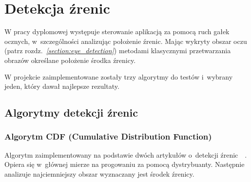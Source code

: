 \newpage

\section{Detekcja źrenic}

W pracy dyplomowej występuje sterowanie aplikacją za pomocą ruch gałek ocznych, w~szczególności analizując położenie źrenic. Mając wykryty obszar oczu (patrz rozdz.~\hyperref[{section:eye_detection}]{\textit{\ref{section:eye_detection}}}) metodami klasycznymi przetwarzania obrazów określane położenie środka źrenicy.

\par

W projekcie zaimplementowane zostały trzy algorytmy do testów i~wybrany jeden, który dawał najlepsze rezultaty.

\subsection{Algorytmy detekcji źrenic}

\subsubsection{Algorytm CDF (Cumulative Distribution Function)}
Algorytm zaimplementowany na podstawie dwóch artykułów o~detekcji źrenic~\cite{IMECSPupilCDFAnalysis}~\cite{EyePupilWebCam}. Opiera się w~głównej mierze na progowaniu za pomocą dystrybuanty. Następnie analizuje najciemniejszy obszar wyznaczany jest środek źrenicy.

